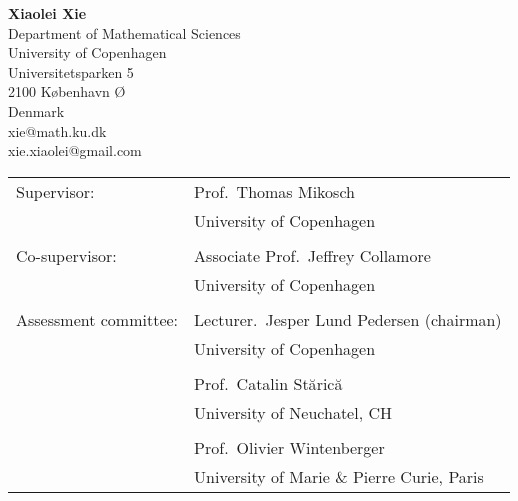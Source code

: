  


\usepackage[numbers,sort&compress]{natbib}
\usepackage{algorithm}
\usepackage{algpseudocode}
\usepackage{appendix}
\usepackage{multirow}
\graphicspath{
        {../papers/FX/}{../papers/Jeffrey1/}
        {../papers/Anja/}
        {../papers/DavisMikoschHeinyXie/}
}







\frontmatter


\newpage
\leavevmode\thispagestyle{empty} 

\hspace*{0.5cm}  {\bf Xiaolei Xie}\\
\hspace*{1.5cm} Department of Mathematical Sciences\\
\hspace*{1.5cm} University of Copenhagen\\
\hspace*{1.5cm} Universitetsparken 5\\
\hspace*{1.5cm} 2100 København Ø\\
\hspace*{1.5cm} Denmark\\
\hspace*{1.5cm} xie@math.ku.dk\\
\hspace*{1.5cm} xie.xiaolei@gmail.com

\vspace*{3cm}

\begin{tabular}{ll}
Supervisor: & Prof.~Thomas Mikosch\\
& University of Copenhagen\\
& \\
Co-supervisor: & Associate Prof.~Jeffrey Collamore\\
& University of Copenhagen\\
& \\

Assessment committee:  & Lecturer.~Jesper Lund Pedersen (chairman)\\
& University of Copenhagen\\
& \\

&  Prof.~Catalin St{\u{a}}ric{\u{a}}\\
& University of Neuchatel, CH \\
& \\

& Prof.~Olivier Wintenberger\\
& University of Marie \& Pierre Curie, Paris
\end{tabular}

